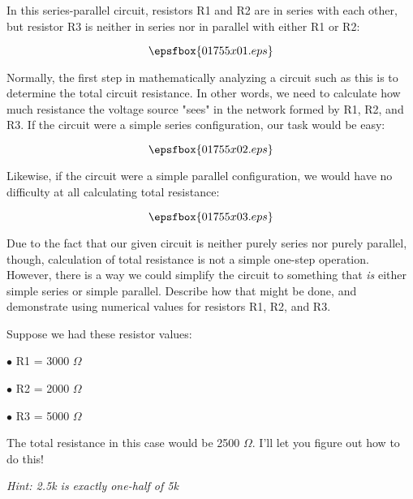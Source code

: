 

In this series-parallel circuit, resistors R1 and R2 are in series with each other, but resistor R3 is neither in series nor in parallel with either R1 or R2:

$$\epsfbox{01755x01.eps}$$

Normally, the first step in mathematically analyzing a circuit such as this is to determine the total circuit resistance.  In other words, we need to calculate how much resistance the voltage source "sees" in the network formed by R1, R2, and R3.  If the circuit were a simple series configuration, our task would be easy:

$$\epsfbox{01755x02.eps}$$

Likewise, if the circuit were a simple parallel configuration, we would have no difficulty at all calculating total resistance:

$$\epsfbox{01755x03.eps}$$

Due to the fact that our given circuit is neither purely series nor purely parallel, though, calculation of total resistance is not a simple one-step operation.  However, there is a way we could simplify the circuit to something that {\it is} either simple series or simple parallel.  Describe how that might be done, and demonstrate using numerical values for resistors R1, R2, and R3.







Suppose we had these resistor values:

\medskip
\item{$\bullet$} R1 = 3000 $\Omega$
\item{$\bullet$} R2 = 2000 $\Omega$
\item{$\bullet$} R3 = 5000 $\Omega$
\medskip

The total resistance in this case would be 2500 $\Omega$.  I'll let you figure out how to do this!  

\vskip 10pt

{\it Hint: 2.5k is exactly one-half of 5k}







